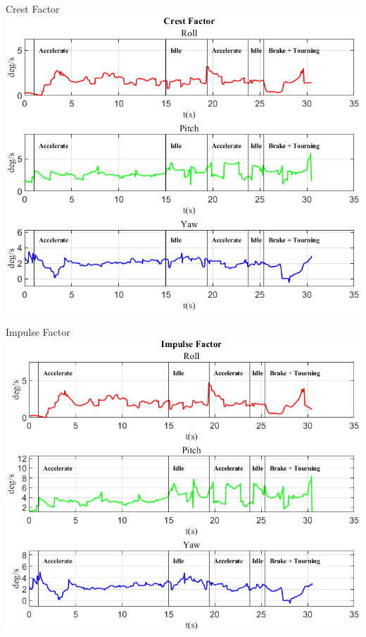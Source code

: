 \documentclass[beamer]{standalone}
\begin{document}
	\begin{frame}{{Crest Factor}}
		\centering\includegraphics[height=.8\textheight]{figure/VAng/Crest Factor}
	\end{frame}
	
	\begin{frame}{{Impulse Factor}}
		\centering\includegraphics[height=.8\textheight]{figure/VAng/Impulse Factor}
	\end{frame}
	
\end{document}
